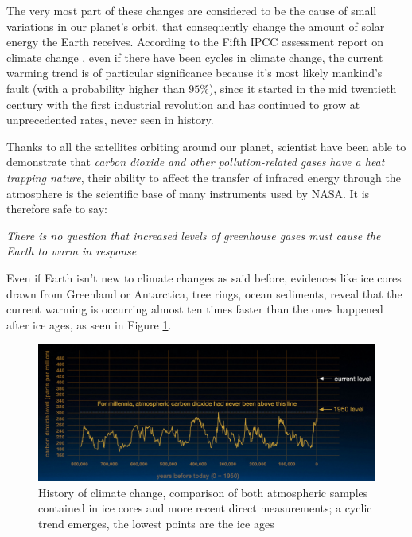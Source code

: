 \documentclass[11pt,a4paper,titlepage]{book}
\begin{document}
The very most part of these changes are considered to be the cause of small variations in our planet's orbit, that consequently change the amount of solar energy the Earth receives.
\newline
\newline
According to the Fifth IPCC assessment report on climate change \cite{ipcc-fifth}, even if there have been cycles in climate change, the current warming trend is of particular significance because it's most likely mankind's fault (with a probability higher than $95\%$), since it started in the mid twentieth century with the first industrial revolution and has continued to grow at unprecedented rates, never seen in history.

Thanks to all the satellites orbiting around our planet, scientist have been able to demonstrate that \textit{carbon dioxide and other pollution-related gases have a heat trapping nature}, their ability to affect the transfer of infrared energy through the atmosphere is the scientific base of many instruments used by NASA. It is therefore safe to say:
\begin{center}
    \textit{There is no question that increased levels of greenhouse gases must cause the Earth to warm in response}
\end{center}
Even if Earth isn't new to climate changes as said before, evidences like ice cores drawn from Greenland or Antarctica, tree rings, ocean sediments, reveal that the current warming is occurring almost ten times faster than the ones happened after ice ages, as seen in Figure \ref{climate_change_nasa}.
\newline
\begin{figure}[ht]
    \includegraphics[scale=0.50]{imgs/ch_1/climate_change_nasa_plot.png}
    \centering
    \caption{History of climate change, comparison of both atmospheric samples contained in ice cores and more recent direct measurements; a cyclic trend emerges, the lowest points are the ice ages}
    \label{climate_change_nasa}
\end{figure}
\end{document}
